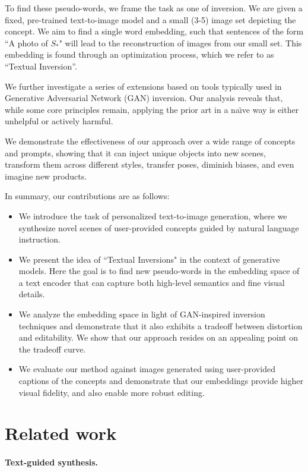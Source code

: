 To find these pseudo-words, we frame the task as one of inversion. We are given a fixed, pre-trained text-to-image model and a small (3-5) image set depicting the concept. We aim to find a single word embedding, such that sentences of the form ``A photo of $S_*$" will lead to the reconstruction of images from our small set. This embedding is found through an optimization process, which we refer to as ``Textual Inversion''. 

We further investigate a series of extensions based on tools typically used in Generative Adversarial Network (GAN) inversion. Our analysis reveals that, while some core principles remain, applying the prior art in a na\"{\i}ve way is either unhelpful or actively harmful.

We demonstrate the effectiveness of our approach over a wide range of concepts and prompts, showing that it can inject unique objects into new scenes, transform them across different styles, transfer poses, diminish biases, and even imagine new products.

In summary, our contributions are as follows:

\begin{itemize}
    \item We introduce the task of personalized text-to-image generation, where we synthesize novel scenes of user-provided concepts guided by natural language instruction.
    \item We present the idea of ``Textual Inversions" in the context of generative models. Here the goal is to find new pseudo-words in the embedding space of a text encoder that can capture both high-level semantics and fine visual details. 
    \item We analyze the embedding space in light of GAN-inspired inversion techniques and demonstrate that it also exhibits a tradeoff between distortion and editability. We show that our approach resides on an appealing point on the tradeoff curve.
    \item We evaluate our method against images generated using user-provided captions of the concepts and demonstrate that our embeddings provide higher visual fidelity, and also enable more robust editing.
\end{itemize}

\section{Related work}

\paragraph{Text-guided synthesis.}

